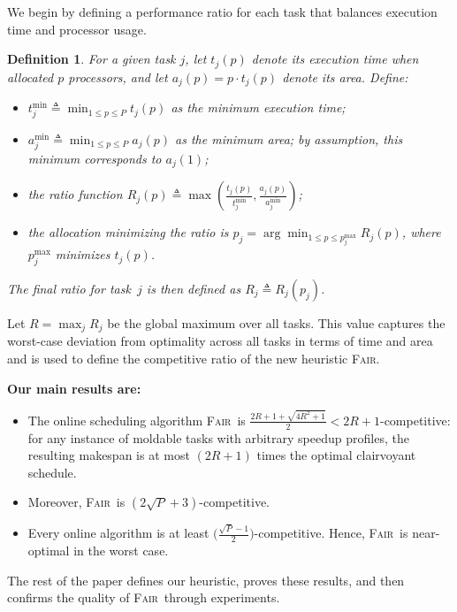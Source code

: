 \documentclass{article}
\newtheorem{definition}{Definition}
\newcommand\fair{\textsc{Fair}\xspace}
\newcommand\ratio{R\xspace}
\begin{document}
We begin by defining a performance ratio for each task that balances execution time and processor usage.

\begin{definition}
\label{def.ratio}
For a given task $j$, let $t_j(p)$ denote its execution time when allocated $p$ processors, and let $a_j(p)=p \cdot t_j(p)$ denote its area. Define:
\begin{itemize}
    \item $t_j^{\min} \triangleq \min_{1 \le p \le P} t_j(p)$ as the minimum execution time;
    \item $a_j^{\min} \triangleq \min_{1 \le p \le P} a_j(p)$ as the minimum area; by assumption, this minimum corresponds to $a_j(1)$;
    \item the ratio function $\ratio_j(p) \triangleq \max\!\left(\frac{t_j(p)}{t_j^{\min}}, \frac{a_j(p)}{a_j^{\min}}\right)$;
    \item the allocation minimizing the ratio is $p_j \!=\! \arg\min_{1 \le p \le p_j^{\max}} \ratio_j(p)$, where $p_j^{\max}$ minimizes $t_j(p)$.
\end{itemize}
The final ratio for task~$j$ is then defined as $\ratio_j \triangleq \ratio_j(p_j)$.
\end{definition}

Let $\ratio = \max_j \ratio_j$ be the global maximum over all tasks. This value captures the worst-case deviation from optimality across all tasks in terms of time and area and is used to define the competitive ratio of the new heuristic \fair.

\textbf{Our main results are:}
\begin{itemize}
    \item The online scheduling algorithm \fair\ is $\frac{2\ratio+1+\sqrt{4\ratio^2+1}}{2}< 2\ratio+1$-competitive: for any instance of moldable tasks with arbitrary speedup profiles, the resulting makespan is at most $(2\ratio+1)$ times the optimal clairvoyant schedule.
    \item Moreover, \fair\ is $(2\sqrt{P}+3)$-competitive.
    \item Every online algorithm is at least $\bigl(\tfrac{\sqrt{P}-1}{2}\bigr)$-competitive. Hence, \fair\ is near-optimal in the worst case.
\end{itemize}

The rest of the paper defines our heuristic, proves these results, and then confirms the quality of \fair\ through experiments.
\end{document}
